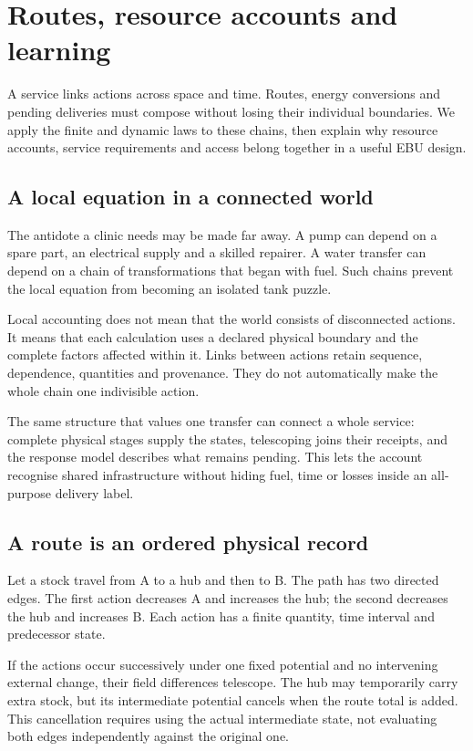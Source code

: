 \chapter{Routes, resource accounts and learning}\label{ch:routes}

A service links actions across space and time. Routes, energy conversions and pending deliveries must compose without losing their individual boundaries. We apply the finite and dynamic laws to these chains, then explain why resource accounts, service requirements and access belong together in a useful EBU design.


\section{A local equation in a connected world}
The antidote a clinic needs may be made far away. A pump can depend on a spare part, an electrical supply and a skilled repairer. A water transfer can depend on a chain of transformations that began with fuel. Such chains prevent the local equation from becoming an isolated tank puzzle.

Local accounting does not mean that the world consists of disconnected actions. It means that each calculation uses a declared physical boundary and the complete factors affected within it. Links between actions retain sequence, dependence, quantities and provenance. They do not automatically make the whole chain one indivisible action.

The same structure that values one transfer can connect a whole service: complete physical stages supply the states, telescoping joins their receipts, and the response model describes what remains pending. This lets the account recognise shared infrastructure without hiding fuel, time or losses inside an all-purpose delivery label.

\section{A route is an ordered physical record}
Let a stock travel from A to a hub and then to B. The path has two directed edges. The first action decreases A and increases the hub; the second decreases the hub and increases B. Each action has a finite quantity, time interval and predecessor state.

If the actions occur successively under one fixed potential and no intervening external change, their field differences telescope. The hub may temporarily carry extra stock, but its intermediate potential cancels when the route total is added. This cancellation requires using the actual intermediate state, not evaluating both edges independently against the original one.

